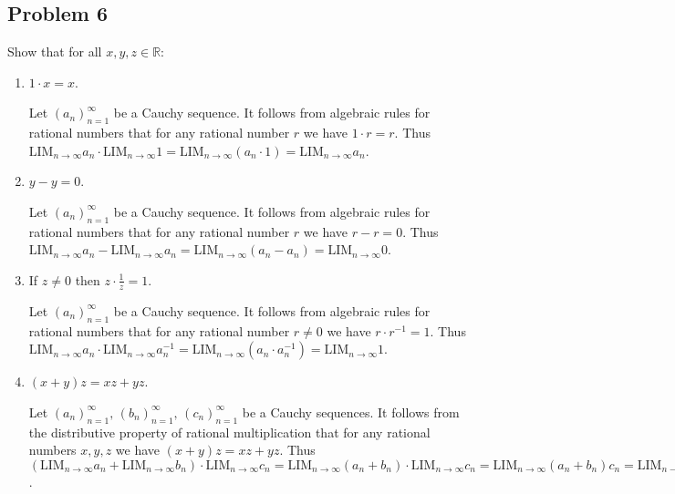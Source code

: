 \documentclass{article}
\theoremstyle{plain}
\theoremstyle{definition}
\begin{document}
\subsection*{Problem 6}
Show that for all \(x,y,z\in\mathbb{R}\):
\begin{enumerate}
	\item \(1\cdot x=x\).
		\begin{IEEEproof}
			Let \((a_n)_{n=1}^\infty\) be a Cauchy sequence. It follows from algebraic rules for rational numbers that for any rational number \(r\) we have \(1\cdot r=r\). Thus \(\text{LIM}_{n\rightarrow\infty}a_n\cdot\text{LIM}_{n\rightarrow\infty}1=\text{LIM}_{n\rightarrow\infty}(a_n\cdot 1)=\text{LIM}_{n\rightarrow\infty}a_n\).
		\end{IEEEproof}
	\item \(y-y=0\).
		\begin{IEEEproof}
			Let \((a_n)_{n=1}^{\infty}\) be a Cauchy sequence. It follows from algebraic rules for rational numbers that for any rational number \(r\) we have \(r-r=0\). Thus \(\text{LIM}_{n\rightarrow\infty}a_n-\text{LIM}_{n\rightarrow\infty}a_n=\text{LIM}_{n\rightarrow\infty}(a_n-a_n)=\text{LIM}_{n\rightarrow\infty}0\).
		\end{IEEEproof}
	\item If \(z\neq 0\) then \(z\cdot\frac{1}{z}=1\).
		\begin{IEEEproof}
			Let \((a_n)_{n=1}^{\infty}\) be a Cauchy sequence. It follows from algebraic rules for rational numbers that for any rational number \(r\neq 0\) we have \(r\cdot r^{-1}=1\). Thus \(\text{LIM}_{n\rightarrow\infty}a_n\cdot\text{LIM}_{n\rightarrow\infty}a_n^{-1}=\text{LIM}_{n\rightarrow\infty}(a_n\cdot a_n^{-1})=\text{LIM}_{n\rightarrow\infty}1\).
		\end{IEEEproof}
	\item \((x+y)z=xz+yz\).
		\begin{IEEEproof}
			Let \((a_n)_{n=1}^{\infty},\,(b_n)_{n=1}^{\infty},\,(c_n)_{n=1}^{\infty}\) be a Cauchy sequences. It follows from the distributive property of rational multiplication that for any rational numbers \(x,y,z\) we have \((x+y)z=xz+yz\). Thus \((\text{LIM}_{n\rightarrow\infty}a_n+\text{LIM}_{n\rightarrow\infty}b_n)\cdot\text{LIM}_{n\rightarrow\infty}c_n=\text{LIM}_{n\rightarrow\infty}(a_n+b_n)\cdot\text{LIM}_{n\rightarrow\infty}c_n=\text{LIM}_{n\rightarrow\infty}(a_n+b_n)c_n=\text{LIM}_{n\rightarrow\infty}(a_nc_n+b_nc_n)=\text{LIM}_{n\rightarrow\infty}a_nc_n+\text{LIM}_{n\rightarrow\infty}b_nc_n\).
		\end{IEEEproof}

\end{enumerate}
\end{document}

